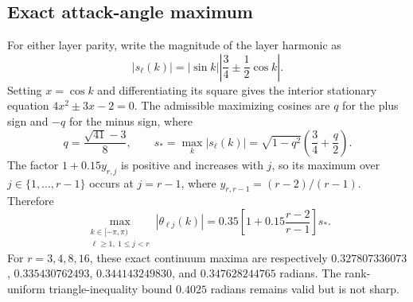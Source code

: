 \subsection{Exact attack-angle maximum}
For either layer parity, write the magnitude of the layer harmonic as
\begin{equation}
 |s_\ell(k)|=|\sin k|\left|\frac34\pm\frac12\cos k\right|.
\end{equation}
Setting $x=\cos k$ and differentiating its square gives the interior stationary equation
$4x^2\pm3x-2=0$. The admissible maximizing cosines are $q$ for the plus sign and $-q$
for the minus sign, where
\begin{equation}
 q=\frac{\sqrt{41}-3}{8},
 \qquad
 s_*=\max_k|s_\ell(k)|
 =\sqrt{1-q^2}\left(\frac34+\frac q2\right).
\end{equation}
The factor $1+0.15y_{r,j}$ is positive and increases with $j$, so its maximum over
$j\in\{1,\ldots,r-1\}$ occurs at $j=r-1$, where
$y_{r,r-1}=(r-2)/(r-1)$. Therefore
\begin{equation}
 \max_{\substack{k\in[-\pi,\pi)\\ \ell\geq1,\ 1\leq j<r}}
 |\theta_{\ell j}(k)|
 =0.35\left[1+0.15\frac{r-2}{r-1}\right]s_*.
\end{equation}
For $r=3,4,8,16$, these exact continuum maxima are respectively
$0.327807336073$, $0.335430762493$, $0.344143249830$, and $0.347628244765$
radians. The rank-uniform triangle-inequality bound $0.4025$ radians remains valid but
is not sharp.

